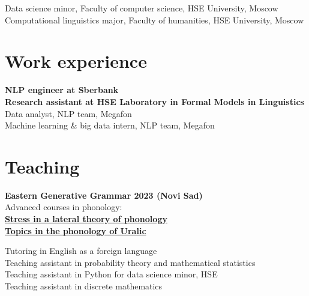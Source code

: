 \documentclass[11pt]{article} %
\begin{document}
 Data science minor, Faculty of computer science, HSE University, Moscow\\
 Computational linguistics major, Faculty of humanities, HSE University, Moscow


\section*{Work experience}

 \textbf{NLP engineer at Sberbank}\\
 \textbf{Research assistant at HSE Laboratory in Formal Models in Linguistics}\\
 Data analyst, NLP team, Megafon\\
 Machine learning \& big data intern, NLP team, Megafon\\

\section*{Teaching}

 \textbf{Eastern Generative Grammar 2023 (Novi Sad)}\\
{Advanced courses in phonology:}\\
\textbf{\href{https://www.eggschool.org/classes/shikunova-stress-in-a-lateral-theory-of-phonology/}{Stress in a lateral theory of phonology}}\\
\textbf{\href{https://www.eggschool.org/classes/shikunova-topics-in-the-phonology-of-uralic/}{Topics in the phonology of Uralic}}

\vspace*{1em}

 Tutoring in English as a foreign language\\
 Teaching assistant in probability theory and mathematical statistics\\
 Teaching assistant in Python for data science minor, HSE\\
 Teaching assistant in discrete mathematics
\end{document}
